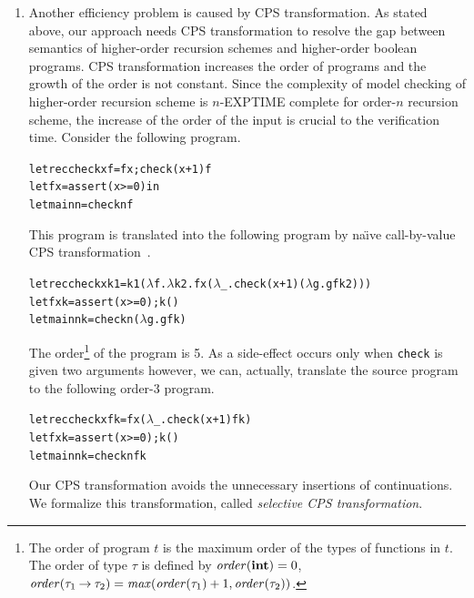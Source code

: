 \begin{enumerate}
\item Another efficiency problem is caused by CPS transformation.  As
      stated above, our approach needs CPS transformation to resolve the
      gap between semantics of higher-order recursion schemes and
      higher-order boolean programs.  CPS transformation increases the
      order of programs and the growth of the order is not constant.
      Since the complexity of
      model checking of higher-order recursion scheme is $n$-EXPTIME complete
      for order-$n$ recursion scheme, the increase of the order of the input
      is crucial to the verification time.  Consider the following program.
\begin{alltt}
let rec check x f = f x; check (x+1) f
let f x = assert (x >= 0) in
let main n = check n f
\end{alltt}
This program is translated into the following program by
na\"{\i}ve call-by-value CPS transformation~\cite{Plotkin1975}.
\begin{alltt}
let rec check x k1 = k1 (\(\lambda\)f.\(\lambda\)k2.f x (\(\lambda\)_.check (x+1) (\(\lambda\)g.g f k2)))
let f x k = assert (x >= 0); k ()
let main n k = check n (\(\lambda\)g. g f k)
\end{alltt}
      The order\footnote{The order of program $t$ is the maximum order of the
      types of functions in $t$.  The order of type $\tau$ is defined by
      $\mathit{order}(\mathbf{int})=0$, $\mathit{order}({\tau_1}\mathbin{\rightarrow}{\tau_2}) =
      \mathit{max}(\mathit{order}(\tau_1)+1, \mathit{order}(\tau_2))$.} of the program is 5.
      As a side-effect occurs only when \texttt{check} is given two arguments however,
      we can, actually, translate the source program to the following order-3 program.
\begin{alltt}
let rec check x f k = f x (\(\lambda\)_.check (x+1) f k)
let f x k = assert (x >= 0); k ()
let main n k = check n f k
\end{alltt}
      Our CPS transformation avoids the unnecessary insertions of
      continuations.  We formalize this transformation, called
      \emph{selective CPS transformation}.


\end{enumerate}
